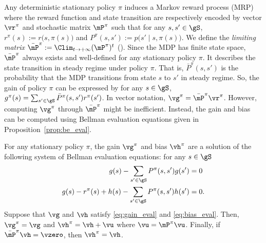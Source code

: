Any deterministic stationary policy $\pi$ induces a Markov reward process (MRP) where the reward function and state transition are respectively encoded by vector $\vr^\pi$ and stochastic matrix $\mP^\pi$ such that for any $s,s'\in\gS$, $r^\pi(s):=r\big(s,\pi(s)\big)$ and $P^\pi(s,s'):=p\big(s'\mid s,\pi(s)\big)$.
We define the \emph{limiting matrix} $\bar{\mP}^\pi:=\Clim_{t\to+\infty}{(\mP^\pi)^t}$ (\cite[Appendix~A.4]{puterman2014markov}). %
Since the MDP has finite state space, $\bar{\mP}^\pi$ always exists and well-defined for any stationary policy $\pi$.
It describes the state transition in steady regime under policy $\pi$. That is, $\bar{P}^\pi(s,s')$ is the probability that the MDP transitions from state $s$ to $s'$ in steady regime.
So, the gain of policy $\pi$ can be expressed by for any $s\in\gS$, $g^\pi(s)=\sum_{s'\in\gS}\bar{P}^\pi(s,s')r^\pi(s')$.
In vector notation, $\vg^\pi=\bar{\mP}^\pi\vr^\pi$.
However, computing $\vg^\pi$ through $\bar{\mP}^\pi$ might be inefficient.
Instead, the gain and bias can be computed using Bellman evaluation equations given in Proposition~\ref{prop:be_eval}.
\begin{prop}
    \label{prop:be_eval}
    For any stationary policy $\pi$, the gain $\vg^\pi$ and bias $\vh^\pi$ are a solution of the following system of Bellman evaluation equations: for any $s\in\gS$
    \begin{align}
        g(s) -\sum_{s'\in\gS}P^\pi(s,s')g(s') &=0 \label{eq:gain_eval}\\
        g(s) -r^\pi(s) +h(s) -\sum_{s'\in\gS}P^\pi(s,s')h(s') &=0. \label{eq:bias_eval}
    \end{align}
    Suppose that $\vg$ and $\vh$ satisfy \eqref{eq:gain_eval} and \eqref{eq:bias_eval}. Then, $\vg^\pi=\vg$ and $\vh^\pi=\vh+\vu$ where $\vu=\mP^\pi\vu$.
    Finally, if $\bar{\mP}^\pi\vh=\vzero$, then $\vh^\pi=\vh$.
\end{prop}

